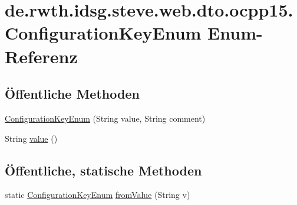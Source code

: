 \hypertarget{enumde_1_1rwth_1_1idsg_1_1steve_1_1web_1_1dto_1_1ocpp15_1_1_configuration_key_enum}{\section{de.\+rwth.\+idsg.\+steve.\+web.\+dto.\+ocpp15.\+Configuration\+Key\+Enum Enum-\/\+Referenz}
\label{enumde_1_1rwth_1_1idsg_1_1steve_1_1web_1_1dto_1_1ocpp15_1_1_configuration_key_enum}
}
\subsection*{Öffentliche Methoden}
\begin{DoxyCompactItemize}
\item 
\hyperlink{enumde_1_1rwth_1_1idsg_1_1steve_1_1web_1_1dto_1_1ocpp15_1_1_configuration_key_enum_a8ad03663602d21dbd077de28bd0e0c59}{Configuration\+Key\+Enum} (String value, String comment)
\item 
String \hyperlink{enumde_1_1rwth_1_1idsg_1_1steve_1_1web_1_1dto_1_1ocpp15_1_1_configuration_key_enum_a42f45495b41a42a7ee0a0b38c5e1f6ab}{value} ()
\end{DoxyCompactItemize}
\subsection*{Öffentliche, statische Methoden}
\begin{DoxyCompactItemize}
\item 
static \hyperlink{enumde_1_1rwth_1_1idsg_1_1steve_1_1web_1_1dto_1_1ocpp15_1_1_configuration_key_enum}{Configuration\+Key\+Enum} \hyperlink{enumde_1_1rwth_1_1idsg_1_1steve_1_1web_1_1dto_1_1ocpp15_1_1_configuration_key_enum_ad57b2424357800024fbaf32a4f8b0859}{from\+Value} (String v)
\end{DoxyCompactItemize}
